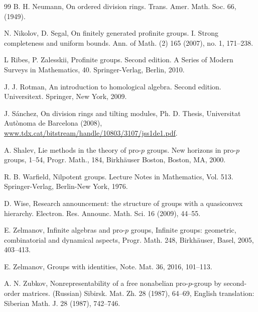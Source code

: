 \documentclass[11pt]{amsart}
\numberwithin{claimcounter}{lem}
\begin{document}
\begin{thebibliography}{99}
   B. H.  Neumann,  On ordered division rings.
Trans. Amer. Math. Soc. 66, (1949).

  N. Nikolov,  D. Segal,   On finitely generated profinite groups. I. Strong completeness and uniform bounds. Ann. of Math. (2) 165 (2007), no. 1, 171--238.

  L Ribes, P. Zalesskii,   Profinite groups. Second edition.  A Series of Modern Surveys in Mathematics, 40. Springer-Verlag, Berlin, 2010.

  J. J. Rotman,    An introduction to homological algebra. Second edition. Universitext. Springer, New York, 2009.
  
   J. S\'anchez, On division rings and tilting modules, Ph. D. Thesis,  Universitat Aut\` onoma de Barcelona  (2008), \url{www.tdx.cat/bitstream/handle/10803/3107/jss1de1.pdf}.
  
 
   A. Shalev, 
Lie methods in the theory of pro-$p$ groups. New horizons in pro-$p$ groups, 1--54,
Progr. Math., 184, Birkh\"auser Boston, Boston, MA, 2000. 

 

  
   
    R. B. Warfield,   Nilpotent groups. Lecture Notes in Mathematics, Vol. 513. Springer-Verlag, Berlin-New York, 1976.
  
    D. Wise, Research announcement: the structure of groups with a quasiconvex hierarchy. Electron. Res. Announc. Math. Sci. 16 (2009), 44--55.
  
   E. Zelmanov, Infinite algebras and pro-$p$ groups, Infinite groups: geometric,
combinatorial and dynamical aspects, Progr. Math. 248,
Birkh\"auser, Basel, 2005, 403--413.
  
 E. Zelmanov, Groups with identities, Note. Mat. 36, 2016, 101--113.
  
  
    A. N. Zubkov,   Nonrepresentability of a free nonabelian pro-$p$-group by second-order matrices. (Russian) Sibirsk. Mat. Zh. 28 (1987),  64--69, English translation: Siberian Math. J. 28 (1987),  742--746.
  
   \end{thebibliography}
  
\end{document}
